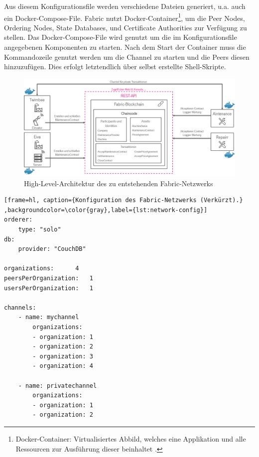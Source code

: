 Aus diesem Konfigurationsfile werden verschiedene Dateien generiert, u.a. auch ein Docker-Compose-File. Fabric nutzt Docker-Container\footnote{Docker-Container: Virtualisiertes Abbild, welches eine Applikation und alle Ressourcen zur Ausführung dieser beinhaltet \cite{ContainerDockerWebsite2017}.}, um die Peer Nodes, Ordering Nodes, State Databases, und Certificate Authorities zur Verfügung zu stellen. Das Docker-Compose-File wird genutzt um die im Konfigurationsfile angegebenen Komponenten zu starten. Nach dem Start der Container muss die Kommandozeile genutzt werden um die Channel zu starten und die Peers diesen hinzuzufügen. Dies erfolgt letztendlich über selbst erstellte Shell-Skripte. 

\begin{figure}[htb]
    \centering
      \includegraphics[width=1.0\textwidth,angle=0]{images/architecture_highlevel}
       \caption{High-Level-Architektur des zu entstehenden Fabric-Netzwerks}
      \label{fig:architecture-high}
\end{figure}

\begin{lstfloat}
\begin{lstlisting}[frame=hl, caption={Konfiguration des Fabric-Netzwerks (Verkürzt).} ,backgroundcolor=\color{gray},label={lst:network-config}]
orderer:
    type: "solo"
db:
    provider: "CouchDB"

organizations:      4
peersPerOrganization:   1
usersPerOrganization:   1

channels:
    - name: mychannel
        organizations:
        - organization: 1
        - organization: 2
        - organization: 3
        - organization: 4

    - name: privatechannel
        organizations:
        - organization: 1
        - organization: 2
\end{lstlisting} 
\end{lstfloat}

